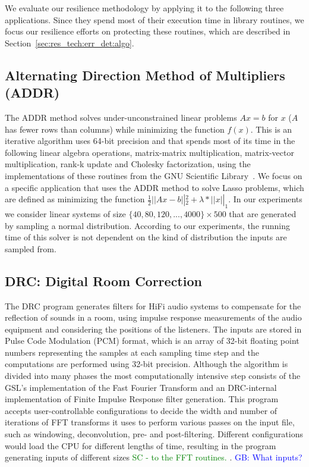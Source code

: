 \documentclass{sig-alternate}
\newcommand{\sui}[1]{%
  \textcolor{green}{SC - #1}
}
\newcommand{\greg}[1]{%
  \textcolor{blue}{GB: #1}
}
\begin{document}
We evaluate our resilience methodology by applying it to the following three applications.
Since they spend most of their execution time in library routines, we focus our resilience efforts on protecting these routines, which are described in Section~\ref{sec:res_tech:err_det:algo}.


\subsection{Alternating Direction Method of Multipliers (ADDR)}
\label{sec:apps:lasso}
The ADDR method solves under-unconstrained linear problems $Ax=b$ for $x$ ($A$ has fewer rows than columns) while minimizing the function $f(x)$.
This is an iterative algorithm uses 64-bit precision and that spends most of its time in the following linear algebra operations, matrix-matrix multiplication, matrix-vector multiplication, rank-k update and Cholesky factorization, using the implementations of these routines from the GNU Scientific Library~\cite{gsl:2011}.
We focus on a specific application that uses the ADDR method to solve Lasso problems, which are defined as minimizing the function $\frac{1}{2} \left|| Ax - b \right||_2^2 + \lambda*\left|| x \right||_1$.
In our experiments we consider linear systems of size $\{40, 80, 120, ..., 4000\} \times 500$ that are generated by sampling a normal distribution.
According to our experiments, the running time of this solver is not dependent on the kind of distribution the inputs are sampled from.

\subsection{DRC: Digital Room Correction}
\label{sec:apps:drc}

The DRC program generates filters for HiFi audio systems to compensate for the reflection of sounds in a room, using impulse response measurements of the audio equipment and considering the positions of the listeners.
The inputs are stored in Pulse Code Modulation (PCM) format, which is an array of 32-bit floating point numbers representing the samples at each sampling time step and the computations are performed using 32-bit precision.
Although the algorithm is divided into many phases the most computationally intensive step consists of the GSL's implementation of the Fast Fourier Transform and an DRC-internal implementation of Finite Impulse Response filter generation.
This program accepts user-controllable configurations to decide the width and number of iterations of FFT transforms it uses to perform various passes on the input file, such as windowing, deconvolution, pre- and post-filtering.
Different configurations would load the CPU for different lengths of time, resulting in the program generating inputs of different sizes \sui{to the FFT routines.}.
\greg{What inputs?}
\end{document}
